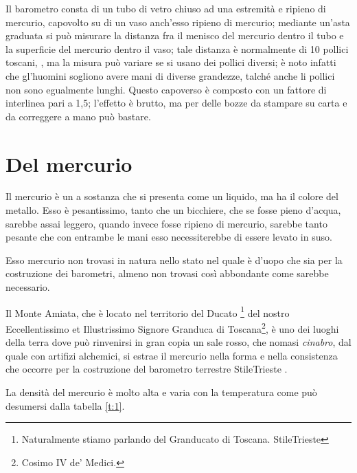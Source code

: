 \documentclass[%
12pt,
twoside,
]{toptesi}
\begin{document}
\begin{interlinea}{1.5}
Il barometro consta di un tubo di vetro chiuso ad una estremità e
ripieno di mercurio, capovolto su di un vaso anch'esso ripieno di
mercurio; mediante un'asta graduata si può misurare la distanza fra
il menisco del mercurio dentro il tubo e la superficie del mercurio
dentro il vaso; tale distanza è normalmente di 10 pollici toscani,
\cite{tor1,tor2}, ma la misura può variare se si usano dei pollici
diversi; è noto infatti che gl'huomini sogliono avere mani di
diverse grandezze, talché anche li pollici non sono egualmente
lunghi. Questo capoverso è composto con un fattore di interlinea pari a 1,5; l'effetto è brutto, ma per delle bozze da stampare su carta e da correggere a mano può bastare.
\end{interlinea}
\section{Del mercurio}
Il mercurio è un a sostanza che si presenta come un liquido, ma ha il colore
del metallo. Esso è pesantissimo, tanto che un bicchiere, che se fosse pieno
d'acqua, sarebbe assai leggero, quando invece fosse ripieno di mercurio,
sarebbe tanto pesante che con entrambe le mani esso necessiterebbe di essere
levato in suso.

Esso mercurio non trovasi in natura nello stato nel quale è d'uopo che sia
per la costruzione dei barometri, almeno non trovasi così abbondante come
sarebbe necessario.

\setcounter{footnote}{25}

Il Monte Amiata, che è locato nel territorio del Ducato%
\footnote{Naturalmente stiamo parlando del Granducato di Toscana.%
\expandafter\ifx\csname StileTrieste\endcsname\NoteWhiteLine\fi
}
del nostro Eccellentissimo et Illustrissimo Signore Granduca di Toscana\footnote{Cosimo IV de' Medici.}, è uno dei
luoghi della terra dove può rinvenirsi in gran copia un sale rosso, che
nomasi \emph{cinabro}, dal quale con artifizi alchemici, si estrae il mercurio
nella forma e nella consistenza che occorre per la costruzione del barometro
terrestre%
\expandafter\ifx\csname StileTrieste\endcsname
{}\fi.


La densità del mercurio è molto alta e varia con la temperatura come
può desumersi dalla tabella \ref{t:1}.
\end{document}
